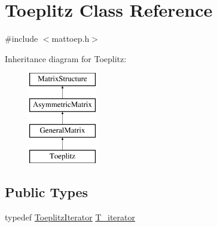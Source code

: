 \hypertarget{classToeplitz}{}\section{Toeplitz Class Reference}
\label{classToeplitz}


{\ttfamily \#include $<$mattoep.\+h$>$}

Inheritance diagram for Toeplitz\+:\begin{figure}[H]
\begin{center}
\leavevmode
\includegraphics[height=4.000000cm]{classToeplitz}
\end{center}
\end{figure}
\subsection*{Public Types}
\begin{DoxyCompactItemize}
\item 
typedef \hyperlink{classToeplitzIterator}{Toeplitz\+Iterator} \hyperlink{classToeplitz_a8bbcba842f8424d8ab8a8d9258c2d734}{T\+\_\+iterator}
\end{DoxyCompactItemize}
